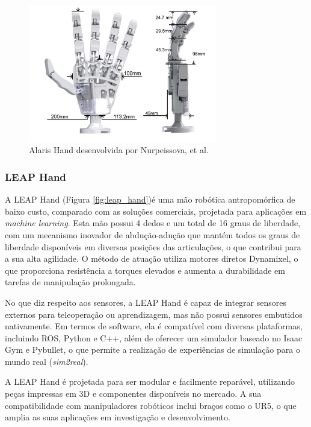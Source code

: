 \begin{figure}[H]
    \centering
    \includegraphics[height=6cm,keepaspectratio]{figs/chapter2/alaris.png}
    \caption{Alaris Hand desenvolvida por Nurpeissova, et al.\cite{Nurpeissova2021}}
    \label{fig:alaris}
    
\end{figure}


\subsubsection{LEAP Hand}

A LEAP Hand \cite{shaw2023leaphand} (Figura \ref{fig:leap_hand})é uma mão robótica antropomórfica de baixo custo, comparado com as soluções comerciais, projetada para aplicações em \textit{machine learning}. 
Esta mão possui 4 dedos e um total de 16 graus de liberdade, com um mecanismo inovador de abdução-adução que mantém todos os graus de liberdade disponíveis em diversas posições das articulações, o que contribui para a sua alta agilidade.
O método de atuação utiliza motores diretos Dynamixel, o que proporciona resistência a torques elevados e aumenta a durabilidade em tarefas de manipulação prolongada.

No que diz respeito aos sensores, a LEAP Hand é capaz de integrar sensores externos para teleoperação ou aprendizagem, mas não possui sensores embutidos nativamente. 
Em termos de software, ela é compatível com diversas plataformas, incluindo \ac{ROS}, Python e C++, além de oferecer um simulador baseado no Isaac Gym e Pybullet, o que permite a realização de experiências de simulação para o mundo real (\textit{sim2real}).

A LEAP Hand é projetada para ser modular e facilmente reparável, utilizando peças impressas em 3D e componentes disponíveis no mercado. A sua compatibilidade com manipuladores robóticos inclui braços como o UR5, o que amplia as suas aplicações em investigação e desenvolvimento.

